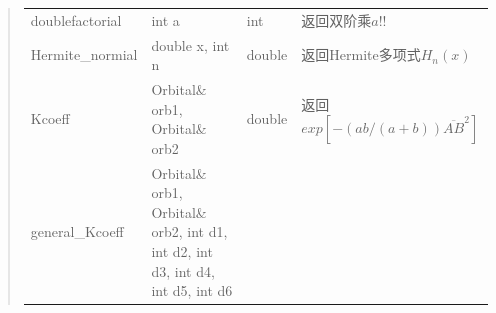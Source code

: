 \documentclass[11pt]{article}
\begin{document}
\begin{quote}
\begin{longtable}[]{@{}llll@{}}
\begin{minipage}[t]{0.17\columnwidth}\raggedright\strut
doublefactorial\strut
\end{minipage} & \begin{minipage}[t]{0.37\columnwidth}\raggedright\strut
int a\strut
\end{minipage} & \begin{minipage}[t]{0.07\columnwidth}\raggedright\strut
int\strut
\end{minipage} & \begin{minipage}[t]{0.27\columnwidth}\raggedright\strut
返回双阶乘\(a!!\)\strut
\end{minipage}\tabularnewline
\begin{minipage}[t]{0.17\columnwidth}\raggedright\strut
Hermite\_normial\strut
\end{minipage} & \begin{minipage}[t]{0.37\columnwidth}\raggedright\strut
double x, int n\strut
\end{minipage} & \begin{minipage}[t]{0.07\columnwidth}\raggedright\strut
double\strut
\end{minipage} & \begin{minipage}[t]{0.27\columnwidth}\raggedright\strut
返回Hermite多项式\(H_n(x)\)\strut
\end{minipage}\tabularnewline
\begin{minipage}[t]{0.17\columnwidth}\raggedright\strut
Kcoeff\strut
\end{minipage} & \begin{minipage}[t]{0.37\columnwidth}\raggedright\strut
Orbital\& orb1, Orbital\& orb2\strut
\end{minipage} & \begin{minipage}[t]{0.07\columnwidth}\raggedright\strut
double\strut
\end{minipage} & \begin{minipage}[t]{0.27\columnwidth}\raggedright\strut
返回\(exp[-(ab/(a+b))\overline{AB}^2]\)\strut
\end{minipage}\tabularnewline
\begin{minipage}[t]{0.17\columnwidth}\raggedright\strut
general\_Kcoeff\strut
\end{minipage} & \begin{minipage}[t]{0.37\columnwidth}\raggedright\strut
Orbital\& orb1, Orbital\& orb2, int d1, int d2, int d3, int d4, int d5,
int d6\strut
\end{minipage} & \begin{minipage}[t]{0.07\columnwidth}\raggedright\strut

\end{minipage}
\end{longtable}
\end{quote}
\end{document}
